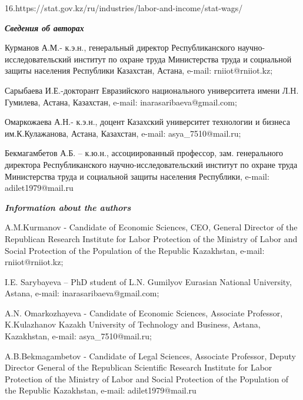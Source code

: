 16.https://stat.gov.kz/ru/industries/labor-and-income/stat-wags/

\emph{{\bfseries Сведения об авторах}}

Курманов А.М.- к.э.н., генеральный директор Республиканского
научно-исследовательский институт по охране труда Министерства труда и
социальной защиты населения Республики Казахстан, Астана, e-mail:
rniiot@rniiot.kz;

Сарыбаева И.Е.-докторант Евразийского национального университета имени
Л.Н. Гумилева, Астана, Казахстан, e-mail: inarasaribaeva@gmail.com;

Омаркожаева А.Н.- к.э.н., доцент Казахский университет технологии и
бизнеса им.К.Кулажанова, Астана, Казахстан, e-mail: asya\_7510@mail.ru;

Бекмагамбетов А.Б. -- к.ю.н., ассоциированный профессор, зам.
генерального директора Республиканского научно-исследовательский
институт по охране труда Министерства труда и социальной защиты
населения Республики, e-mail: adilet1979@mail.ru

\emph{{\bfseries Information about the authors}}

A.M.Kurmanov - Candidate of Economic Sciences, CEO, General Director of
the Republican Research Institute for Labor Protection of the Ministry
of Labor and Social Protection of the Population of the Republic
Kazakhstan, e-mail: rniiot@rniiot.kz;

I.E. Sarybayeva -- PhD student of L.N. Gumilyov Eurasian National
University, Astana, e-mail: inarasaribaeva@gmail.com;

A.N. Omarkozhayeva - Candidate of Economic Sciences, Associate
Professor, K.Kulazhanov Kazakh University of Technology and Business,
Astana, Kazakhstan, e-mail: asya\_7510@mail.ru;

A.B.Bekmagambetov - Candidate of Legal Sciences, Associate Professor,
Deputy Director General of the Republican Scientific Research Institute
for Labor Protection of the Ministry of Labor and Social Protection of
the Population of the Republic Kazakhstan, e-mail: adilet1979@mail.ru